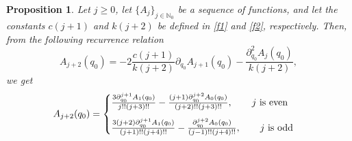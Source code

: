 \documentclass[reqno,11pt]{amsart}
\numberwithin{equation}{section}
\newtheorem{proposition}[theorem]{Proposition}
\theoremstyle{definition}
\begin{document}
\begin{proposition}
	\label{recc}
Let $j \geq 0$, let $\{A_j\}_{j \in \mathbb{N}_0}$ be a sequence of functions, and let the constants $c(j+1)$ and $k(j+2)$ be defined in \eqref{f1} and \eqref{f2}, respectively. Then, from the following recurrence relation
	\begin{equation}
		\label{rel}
		A_{j+2}(q_0)=-2 \frac{c(j+1)}{k(j+2)} \partial_{q_0} A_{j+1}(q_0)-\frac{\partial_{q_0}^2 A_j(q_0)}{k(j+2)},
	\end{equation}
	we get
	\begin{equation}
		\label{f3}
		A_{j+2}(q_0)=
		\begin{cases}
			\vspace*{3mm}
			\frac{3 \partial_{q_0}^{j+1} A_1(q_0)}{j!! (j+3)!!}-\frac{(j+1)\partial_{q_0}^{j+2}A_0(q_0)}{(j+2)!!(j+3)!!}, \qquad j  \, \, \hbox{is even}\\
			\frac{3 (j+2) \partial_{q_0}^{j+1} A_1(q_0)}{(j+1)!! (j+4)!!}- \frac{\partial_{q_0}^{j+2}A_0(q_0)}{(j-1)!! (j+4)!!}, \qquad j \, \, \hbox{is odd}
		\end{cases}
	\end{equation}
\end{proposition}
\end{document}
